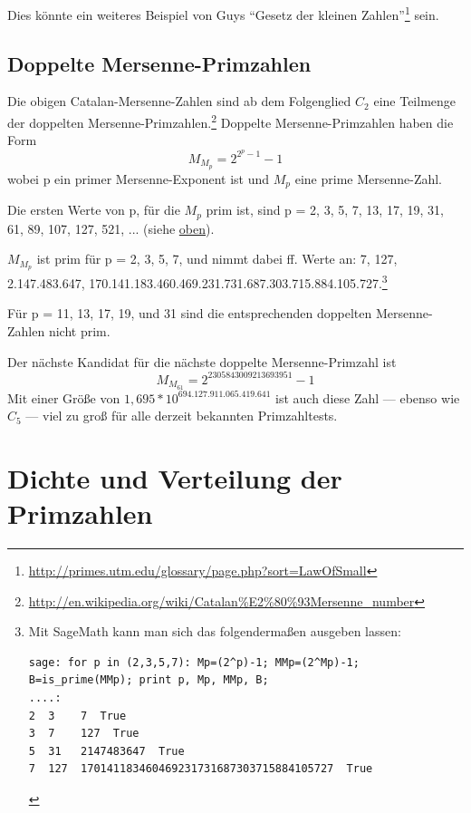 \begin{refsegment}
 Dies könnte ein weiteres Beispiel von Guys "`Gesetz der kleinen Zahlen"'\footnote{%
\url{http://primes.utm.edu/glossary/page.php?sort=LawOfSmall}
   } sein.



\subsection[Doppelte Mersenne-Primzahlen]
           {Doppelte Mersenne-Primzahlen}

Die obigen Catalan-Mersenne-Zahlen sind ab dem Folgenglied $C_2$ eine Teilmenge
der doppelten Mersenne-Primzahlen.\footnote{%
   \url{http://en.wikipedia.org/wiki/Catalan%E2%80%93Mersenne_number}
   }
Doppelte Mersenne-Primzahlen haben die Form
$$ M_{M_p} = 2 ^ {2^p - 1} -1 $$ %
wobei p ein primer Mersenne-Exponent ist und $M_p$ eine prime Mersenne-Zahl.

Die ersten Werte von p, für die $M_p$ prim ist, sind p = 2, 3, 5, 7, 13, 17, 19,
31, 61, 89, 107, 127, 521, ... (siehe \hyperlink{MersenneNumbers01}{oben}).

$M_{M_p}$ ist prim für p = 2, 3, 5, 7, und nimmt dabei ff. Werte an: 7, 127,
2.147.483.647, 170.141.183.460.469.231.731.687.303.715.884.105.727.\footnote{%
Mit SageMath kann man sich das folgendermaßen ausgeben lassen:
\begin{Verbatim}
sage: for p in (2,3,5,7): Mp=(2^p)-1; MMp=(2^Mp)-1; B=is_prime(MMp); print p, Mp, MMp, B;
....:
2  3    7  True
3  7    127  True
5  31   2147483647  True
7  127  170141183460469231731687303715884105727  True
\end{Verbatim}
}

Für p = 11, 13, 17, 19, und 31 sind die entsprechenden doppelten
Mersenne-Zahlen nicht prim.

Der nächste Kandidat für die nächste doppelte Mersenne-Primzahl ist
$$ M_{M_{61}} = 2^{2305843009213693951} - 1$$
Mit einer Größe von $ 1,695 * 10^{694.127.911.065.419.641} $ ist auch diese Zahl --- ebenso wie $C_5$ --- viel zu groß für alle derzeit bekannten Primzahltests.



\hypertarget{h_Primes_Distrib-of-Primes}{}
\section{Dichte und Verteilung der Primzahlen}
\label{l_Primes_Distrib-of-Primes}


\end{refsegment}

